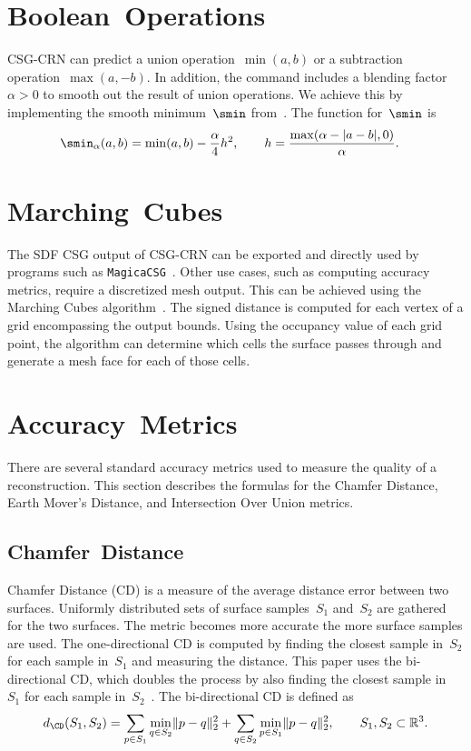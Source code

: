 \section{Boolean~Operations}
\label{subsec:boolean_operations}

CSG-CRN can predict a union operation~$\min(a,b)$ or a subtraction operation~$\max(a,-b)$. In addition, the command includes a blending factor~$\alpha > 0$ to smooth out the result of union operations. We achieve this by implementing the smooth minimum~$\smin$ from~\cite{Quilez2013}. The function for~$\smin$ is
\begin{align*}
	\smin_\alpha(a, b) &= \min(a, b) - \frac{\alpha}{4} h^2, \qquad
	h = \frac{\max(\alpha - |a - b|, 0)}{\alpha}.
\end{align*}

\section{Marching~Cubes}
\label{sec:marching_cubes}

The SDF CSG output of CSG-CRN can be exported and directly used by programs such as \texttt{MagicaCSG}~\cite{Ephtracy2022}. Other use cases, such as computing accuracy metrics, require a discretized mesh output. This can be achieved using the Marching Cubes algorithm~\cite{Lorensen1987}. The signed distance is computed for each vertex of a grid encompassing the output bounds. Using the occupancy value of each grid point, the algorithm can determine which cells the surface passes through and generate a mesh face for each of those cells.

\section{Accuracy~Metrics}
\label{sec:accuracy_metrics}

There are several standard accuracy metrics used to measure the quality of a reconstruction. This section describes the formulas for the Chamfer Distance, Earth Mover's Distance, and Intersection Over Union metrics.

\subsection{Chamfer~Distance}
\label{subsec:chamfer_distance}

Chamfer Distance (CD) is a measure of the average distance error between two surfaces. Uniformly distributed sets of surface samples~$S_1$ and~$S_2$ are gathered for the two surfaces. The metric becomes more accurate the more surface samples are used. The one-directional CD is computed by finding the closest sample in~$S_2$ for each sample in~$S_1$ and measuring the distance. This paper uses the bi-directional CD, which doubles the process by also finding the closest sample in~$S_1$ for each sample in~$S_2$~\cite{Fan2017}. The bi-directional CD is defined as
\begin{equation*}
	d_{\CD}(S_1, S_2) = \sum_{p \in S_1} \min_{q \in S_2} \lVert p - q \rVert_2^2 + \sum_{q \in S_2} \min_{p \in S_1} \lVert p - q \rVert_2^2, \qquad S_1, S_2 \subset \mathbb{R}^3.
\end{equation*}

